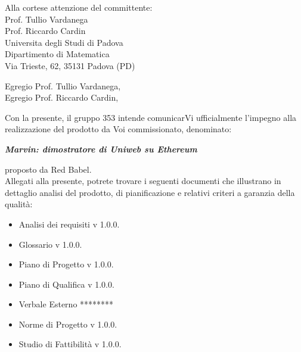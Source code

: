\documentclass[openany, a4paper, 12pt]{letter}
\begin{document}
	
	\begin{letter}{
			Alla cortese attenzione del committente:\\
			\smallskip
			Prof. Tullio Vardanega\\
			Prof. Riccardo Cardin\\
			\medskip
			Universita degli Studi di Padova \\
			Dipartimento di Matematica\\
			Via Trieste, 62, 35131 Padova (PD)}
			\opening{Egregio Prof. Tullio Vardanega, \\
				Egregio Prof. Riccardo Cardin,}
			Con la presente, il gruppo 353 intende comunicarVi ufficialmente l’impegno alla realizzazione del
			prodotto da Voi commissionato, denominato: \\
			\begin{center}
			\emph{\textbf{Marvin: dimostratore di Uniweb su Ethereum}}\medskip \\
			\end{center}
			proposto da Red Babel.\medskip\\
			Allegati alla presente, potrete trovare i seguenti documenti che illustrano in dettaglio analisi del
			prodotto, di pianificazione e relativi criteri a garanzia della qualità: 
			\begin{itemize}
				\item Analisi dei requisiti v 1.0.0.
				\item Glossario v 1.0.0.
				\item Piano di Progetto v 1.0.0.
				\item Piano di Qualifica v 1.0.0.
				\item Verbale Esterno ********%
				\item Norme di Progetto v 1.0.0.
				\item Studio di Fattibilità v 1.0.0.
				\end{itemize}
			
			\thispagestyle{firstpage}
			\newpage
			

\end{letter}
\end{document}
